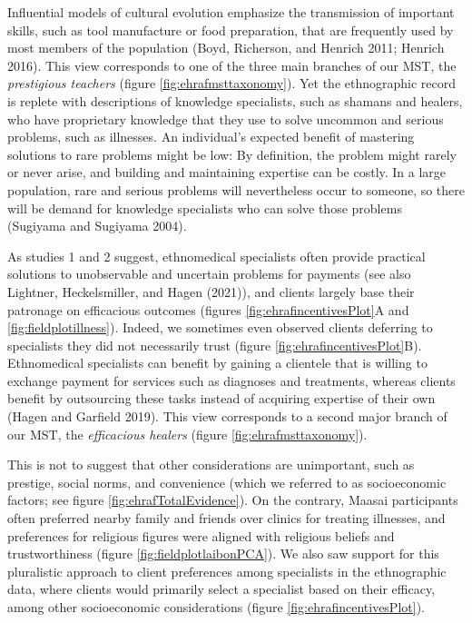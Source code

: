 \documentclass[
  11pt,
]{article}
\begin{document}
Influential models of cultural evolution emphasize the transmission of important skills, such as tool manufacture or food preparation, that are frequently used by most members of the population (Boyd, Richerson, and Henrich 2011; Henrich 2016). This view corresponds to one of the three main branches of our MST, the \emph{prestigious teachers} (figure \ref{fig:ehrafmsttaxonomy}). Yet the ethnographic record is replete with descriptions of knowledge specialists, such as shamans and healers, who have proprietary knowledge that they use to solve uncommon and serious problems, such as illnesses. An individual's expected benefit of mastering solutions to rare problems might be low: By definition, the problem might rarely or never arise, and building and maintaining expertise can be costly. In a large population, rare and serious problems will nevertheless occur to someone, so there will be demand for knowledge specialists who can solve those problems (Sugiyama and Sugiyama 2004).

As studies 1 and 2 suggest, ethnomedical specialists often provide practical solutions to unobservable and uncertain problems for payments (see also Lightner, Heckelsmiller, and Hagen (2021)), and clients largely base their patronage on efficacious outcomes (figures \ref{fig:ehrafincentivesPlot}A and \ref{fig:fieldplotillness}). Indeed, we sometimes even observed clients deferring to specialists they did not necessarily trust (figure \ref{fig:ehrafincentivesPlot}B). Ethnomedical specialists can benefit by gaining a clientele that is willing to exchange payment for services such as diagnoses and treatments, whereas clients benefit by outsourcing these tasks instead of acquiring expertise of their own (Hagen and Garfield 2019). This view corresponds to a second major branch of our MST, the \emph{efficacious healers} (figure \ref{fig:ehrafmsttaxonomy}).

This is not to suggest that other considerations are unimportant, such as prestige, social norms, and convenience (which we referred to as socioeconomic factors; see figure \ref{fig:ehrafTotalEvidence}). On the contrary, Maasai participants often preferred nearby family and friends over clinics for treating illnesses, and preferences for religious figures were aligned with religious beliefs and trustworthiness (figure \ref{fig:fieldplotlaibonPCA}). We also saw support for this pluralistic approach to client preferences among specialists in the ethnographic data, where clients would primarily select a specialist based on their efficacy, among other socioeconomic considerations (figure \ref{fig:ehrafincentivesPlot}).
\end{document}
